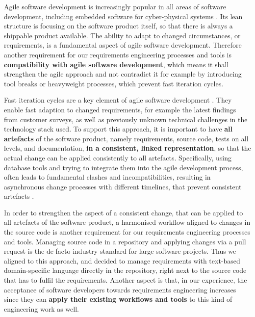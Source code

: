 \documentclass[english]{lni}
\begin{document}
Agile software development is increasingly popular in all areas of
software development, including embedded software for cyber-physical
systems \cite{6225488}. Its lean structure is focusing on the software
product itself, so that there is always a shippable product
available. The ability to adapt to changed circumstances, or
requirements, is a fundamental aspect of agile software
development. Therefore another requirement for our requirements
engineering processes and tools is \textbf{compatibility with agile
  software development}, which means it shall strengthen the agile
approach and not contradict it for example by introducing tool breaks
or heavyweight processes, which prevent fast iteration cycles.

Fast iteration cycles are a key element of agile software development
\cite{beck2001manifesto}. They enable fast adaption to changed
requirements, for example the latest findings from customer surveys, as
well as previously unknown technical challenges in the technology
stack used. To support this approach, it is important to have
\textbf{all artefacts} of the software product, namely requirements,
source code, tests on all levels, and documentation, \textbf{in a
  consistent, linked representation}, so that the actual change can be
applied consistently to all artefacts. %
Specifically, using database tools and trying to
integrate them into the agile development process, often leads to
fundamental clashes and incompatibilities, resulting in asynchronous
change processes with different timelines, that prevent consistent
artefacts \cite{becker2020}.

In order to strengthen the aspect of a consistent change, that can be
applied to all artefacts of the software product, a harmonised
workflow aligned to changes in the source code is another requirement
for our requirements engineering processes and tools. Managing source
code in a repository and applying changes via a pull request is the de
facto industry standard for large software projects. Thus we aligned
to this approach, and decided to manage requirements with text-based
domain-specific language directly in the repository, right next to the
source code that has to fulfil the requirements. Another aspect is
that, in our experience, the acceptance of software developers towards
requirements engineering increases since they can \textbf{apply
  their existing workflows and tools} to this kind of engineering work
as well.
\end{document}
